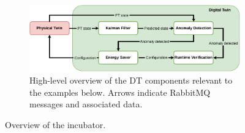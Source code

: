 \begin{figure}[ht]
	\begin{subfigure}[t]{0.9\columnwidth}
		\centering
		\includegraphics[width=\textwidth]{images/incubator_anomaly_HL.pdf}
		\caption{High-level overview of the DT components relevant to the examples below. Arrows indicate RabbitMQ messages and associated data.}
		\label{subfig:incubator_anomaly}
	\end{subfigure}
	\caption{Overview of the incubator.}
	\label{fig:incubator}
\end{figure}

